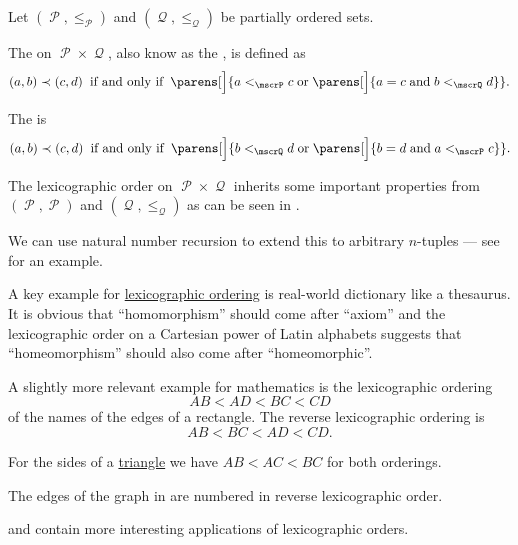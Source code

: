 \begin{definition}\label{def:lexicographic_order}
  Let \( (\mscrP, \leq_\mscrP) \) and \( (\mscrQ, \leq_\mscrQ) \) be partially ordered sets.

  The  on \( \mscrP \times \mscrQ \), also know as the , is defined as
  \begin{equation}\label{eq:def:lexicographic_order}
    (a, b) \prec (c, d) \thickspace \T{if and only if} \thickspace \parens[\Big]{ a <_\mscrP c \T{or} \parens[\Big]{ a = c \T{and} b <_\mscrQ d } }.
  \end{equation}

  The  is
  \begin{equation}\label{eq:def:lexicographic_order/reverse}
    (a, b) \prec (c, d) \thickspace \T{if and only if} \thickspace \parens[\Big]{ b <_\mscrQ d \T{or} \parens[\Big]{ b = d \T{and} a <_\mscrP c } }.
  \end{equation}

  The lexicographic order on \( \mscrP \times \mscrQ \) inherits some important properties from \( (\mscrP, \mscrP) \) and \( (\mscrQ, \leq_\mscrQ) \) as can be seen in .

  We can use natural number recursion to extend this to arbitrary \( n \)-tuples --- see  for an example.
\end{definition}

\begin{example}\label{ex:def:lexicographic_order}
  A key example for \hyperref[def:lexicographic_order]{lexicographic ordering} is real-world dictionary like a thesaurus. It is obvious that \enquote{homomorphism} should come after \enquote{axiom} and the lexicographic order on a Cartesian power of Latin alphabets suggests that \enquote{homeomorphism} should also come after \enquote{homeomorphic}.

  A slightly more relevant example for mathematics is the lexicographic ordering
  \begin{equation*}
    AB < AD < BC < CD
  \end{equation*}
  of the names of the edges of a rectangle. The reverse lexicographic ordering is
  \begin{equation*}
    AB < BC < AD < CD.
  \end{equation*}

   For the sides of a \hyperref[def:triangle]{triangle} we have \( AB < AC < BC \) for both orderings.

  The edges of the graph in  are numbered in reverse lexicographic order.

   and  contain more interesting applications of lexicographic orders.
\end{example}

